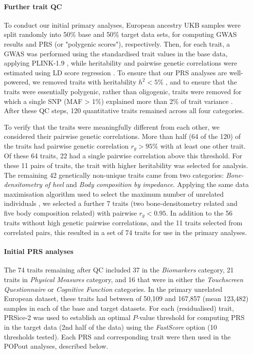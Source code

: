 \documentclass[12pt]{zHenriquesLab-StyleBioRxiv}
\begin{document}
{{\paragraph*{Further trait QC}
To conduct our initial primary analyses, European ancestry UKB samples were split 
randomly into 50\% base and 50\% target data sets, for computing GWAS results and 
PRS (or "polygenic scores"), respectively. Then, for each trait, a GWAS was performed 
using the standardised trait values in the base data, applying PLINK-1.9 \cite{plink,bt_10}, 
while heritability and pairwise genetic correlations were estimated using LD score regression \cite{ldsc}.  
To ensure that our PRS analyses are well-powered, we removed traits 
with heritability $h^2<5\%$ \cite{Choi2020}, and to ensure that the traits were 
essentially polygenic, rather than oligogenic, traits were removed for which a single SNP (MAF > 1\%) 
explained more than 2\% of trait variance \cite{2prule}. 
After these QC steps, 120 quantitative traits remained across all four categories. 

To verify that the traits were meaningfully different from each other, we considered their  
pairwise genetic correlations. More than half (64 of the 120) of the traits had pairwise genetic 
correlation $r_g>95\%$ with at least one other trait. Of these 64 traits, 22 had a single pairwise 
correlation above this threshold. For these 11 pairs of traits, the trait with higher heritability 
was selected for analysis.  The remaining 42 genetically non-unique traits came from two 
categories: \textit{ Bone-densitometry of heel}  and \textit{ Body composition by impedance}. Applying the 
same data maximisation algorithm used to select the maximum number of unrelated 
individuals \cite{erase}, we selected a further 7 traits (two bone-densitometry related and five body 
composition related) with pairwise $r_g<0.95$.  In addition to 
the 56 traits without high genetic pairwise correlations, and the 11 traits 
selected from correlated pairs, this resulted in a set of 74 traits for use in the primary analyses. 

\paragraph*{Initial PRS analyses}
The 74 traits remaining after QC included 37 in the \textit{Biomarkers} category, 
21 traits in \textit{Physical Measures} category, and 16 that were in either 
the \textit{Touchscreen Questionnaire} or \textit{Cognitive Function} categories.  
In the primary unrelated European dataset, these traits had between of 50,109 and 167,857 
(mean 123,482) samples in each of the base and target datasets. For each (residualised) trait, 
PRSice-2 \cite{prsice} was used to establish an optimal $P$-value threshold for computing PRS in 
the target data (2nd half of the data) using the \textit{FastScore} option (10 thresholds tested). 
Each PRS and corresponding trait were then used in the POPout analyses, described below. 

}}
\end{document}
